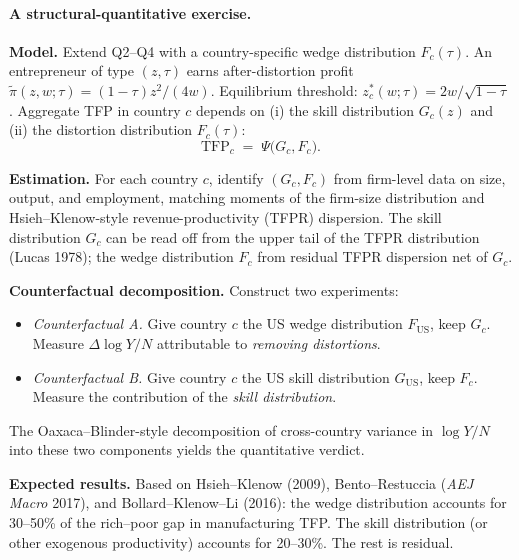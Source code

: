 \documentclass[11pt,a4paper]{article}
\begin{document}
\paragraph{A structural-quantitative exercise.}

\textbf{Model.} Extend Q2--Q4 with a country-specific wedge distribution $F_{c}(\tau)$. An entrepreneur of type $(z,\tau)$ earns after-distortion profit $\tilde\pi(z,w;\tau)=(1-\tau)z^{2}/(4w)$. Equilibrium threshold: $z^{*}_{c}(w;\tau)=2w/\sqrt{1-\tau}$. Aggregate TFP in country $c$ depends on (i) the skill distribution $G_{c}(z)$ and (ii) the distortion distribution $F_{c}(\tau)$:
\begin{equation}
\mathrm{TFP}_{c}\;=\;\Psi\bigl(G_{c},F_{c}\bigr).
\label{eq:q7_TFP}
\end{equation}

\textbf{Estimation.} For each country $c$, identify $(G_{c},F_{c})$ from firm-level data on size, output, and employment, matching moments of the firm-size distribution and Hsieh--Klenow-style revenue-productivity (TFPR) dispersion. The skill distribution $G_{c}$ can be read off from the upper tail of the TFPR distribution (Lucas 1978); the wedge distribution $F_{c}$ from residual TFPR dispersion net of $G_{c}$.

\textbf{Counterfactual decomposition.} Construct two experiments:
\begin{itemize}[leftmargin=*,itemsep=1pt]
    \item \emph{Counterfactual A.} Give country $c$ the US wedge distribution $F_{\text{US}}$, keep $G_{c}$. Measure $\Delta\log Y/N$ attributable to \emph{removing distortions}.
    \item \emph{Counterfactual B.} Give country $c$ the US skill distribution $G_{\text{US}}$, keep $F_{c}$. Measure the contribution of the \emph{skill distribution}.
\end{itemize}
The Oaxaca--Blinder-style decomposition of cross-country variance in $\log Y/N$ into these two components yields the quantitative verdict.

\textbf{Expected results.} Based on Hsieh--Klenow (2009), Bento--Restuccia (\emph{AEJ Macro} 2017), and Bollard--Klenow--Li (2016): the wedge distribution accounts for 30--50\% of the rich--poor gap in manufacturing TFP. The skill distribution (or other exogenous productivity) accounts for 20--30\%. The rest is residual.
\end{document}
